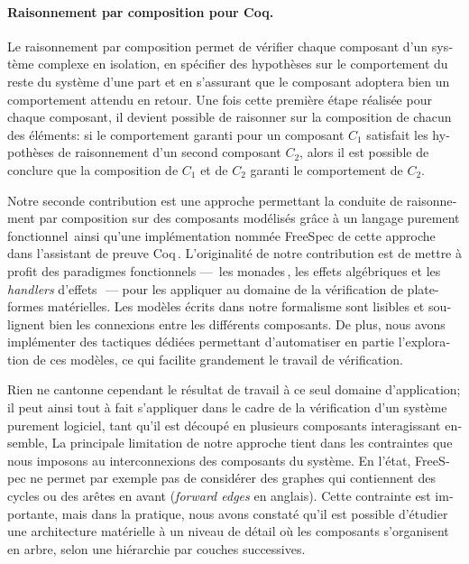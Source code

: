\begin{otherlanguage}{french}
  \paragraph{Raisonnement par composition pour Coq.}
  Le raisonnement par composition permet de vérifier chaque composant d’un
  système complexe en isolation, en spécifier des hypothèses sur le comportement
  du reste du système d’une part et en s’assurant que le composant adoptera bien
  un comportement attendu en retour.
  Une fois cette première étape réalisée pour chaque composant, il devient
  possible de raisonner sur la composition de chacun des éléments: si le
  comportement garanti pour un composant \( C_1 \) satisfait les hypothèses de
  raisonnement d’un second composant \( C_2 \), alors il est possible de
  conclure que la composition de \( C_1 \) et de \( C_2 \) garanti le
  comportement de \( C_2 \).

  Notre seconde contribution est une approche permettant la conduite de
  raisonnement par composition sur des composants modélisés grâce à un langage
  purement fonctionnel\,\cite{letan2018freespec} ainsi qu’une implémentation
  nommée FreeSpec de cette approche\,\cite{letan2018freespeccode} dans
  l’assistant de preuve Coq\,\cite{coq}.
  L’originalité de notre contribution est de mettre à profit des paradigmes
  fonctionnels ---~les monades\,\cite{jones2005io}, les effets algébriques et
  les \emph{handlers} d’effets\,\cite{bauer2015effects}~--- pour les appliquer
  au domaine de la vérification de plate-formes matérielles.
  Les modèles écrits dans notre formalisme sont lisibles et soulignent bien les
  connexions entre les différents composants.
  De plus, nous avons implémenter des tactiques dédiées permettant d’automatiser
  en partie l’exploration de ces modèles, ce qui facilite grandement le travail
  de vérification.

  Rien ne cantonne cependant le résultat de travail à ce seul domaine
  d’application; il peut ainsi tout à fait s’appliquer dans le cadre de la
  vérification d’un système purement logiciel, tant qu’il est découpé en
  plusieurs composants interagissant ensemble,
  La principale limitation de notre approche tient dans les contraintes que nous
  imposons au interconnexions des composants du système.
  En l’état, FreeSpec ne permet par exemple pas de considérer des graphes qui
  contiennent des cycles ou des \og{} arêtes en avant \fg{} (\emph{forward
    edges} en anglais).
  Cette contrainte est importante, mais dans la pratique, nous avons constaté
  qu’il est possible d’étudier une architecture matérielle à un niveau de détail
  où les composants s’organisent en arbre, selon une hiérarchie par couches
  successives.


\end{otherlanguage}
